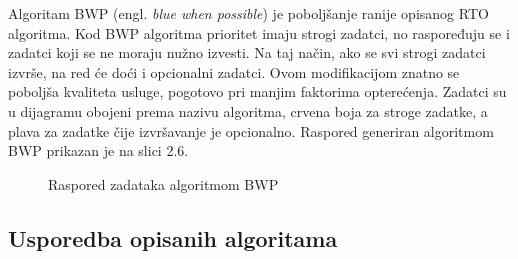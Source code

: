 \documentclass[../zavrsni.tex]{subfiles}
\begin{document}
Algoritam BWP (engl. \textit{blue when possible}) je poboljšanje ranije opisanog RTO algoritma. Kod BWP algoritma prioritet imaju strogi zadatci, 
no raspoređuju se i zadatci koji se ne moraju nužno izvesti. Na taj način, ako se svi strogi zadatci izvrše, na red će doći
i opcionalni zadatci. Ovom modifikacijom znatno se poboljša kvaliteta usluge, pogotovo pri
 manjim faktorima opterećenja. Zadatci su u dijagramu obojeni prema nazivu algoritma, crvena boja za stroge zadatke, a plava za zadatke 
 čije izvršavanje je opcionalno. Raspored generiran algoritmom BWP prikazan je na slici 2.6.

 \begin{figure}[h!]
    \centering

    \begin{RTGrid}[width=13cm]{3}{24}

    
  
    
  
    

    \end{RTGrid}

    \caption{Raspored zadataka algoritmom BWP}
    \label{fig:ex1}
  \end{figure}

\subsection{Usporedba opisanih algoritama}
\end{document}
